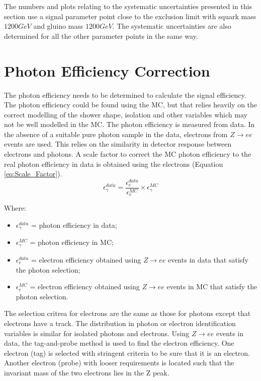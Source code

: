 The numbers and plots relating to the systematic uncertainties presented in this 
section use a signal parameter point close to the exclusion limit with squark 
mass $1200\unit{GeV}$ and gluino mass $1200\unit{GeV}$. The systematic 
uncertainties are also determined for all the other parameter points in the same 
way.

\section{Photon Efficiency Correction}
\label{sec:phoeff}

The photon efficiency needs to be determined to calculate the signal efficiency.
The photon efficiency could be found using the MC, but that relies heavily on
the correct modelling of the shower shape, isolation and other variables which
may not be well modelled in the MC. The photon efficiency is measured from data. 
In the absence of a suitable pure photon sample in the data, electrons from 
$Z\rightarrow ee$ events are used. This relies on the similarity in detector 
response between electrons and photons. A scale factor to correct the MC photon 
efficiency to the real photon efficiency in data is obtained using the electrons 
(Equation \ref{eq:Scale_Factor}). \\

\begin{equation}
\epsilon_{\gamma}^{data} = \frac{\epsilon_{e}^{data}}{\epsilon_{e}^{MC}}
\times \epsilon_{\gamma}^{MC}
\label{eq:Scale_Factor}
\end{equation}  

Where:
\begin{itemize}
\item $\epsilon_{\gamma}^{data}$ = photon efficiency in data;
\item $\epsilon_{\gamma}^{MC}$ = photon efficiency in MC;
\item $\epsilon_{e}^{data}$ = electron efficiency obtained using $Z\rightarrow
ee$ events in data that satisfy the photon selection; 
\item $\epsilon_{e}^{MC}$ = electron efficiency obtained using $Z\rightarrow ee$
events in MC that satisfy the photon selection. 
\end{itemize}

The selection critrea for electrons are the same as those for photons except 
that electrons have a track. The distribution in photon or electron 
identification variables is similar for isolated photons and electrons. Using 
$Z\rightarrow ee$ events in data, the tag-and-probe method is used to find the 
electron efficiency. One electron (tag) is selected with stringent criteria to 
be sure that it is an electron. Another electron (probe) with looser 
requirements is located such that the invariant mass of the two electrons lies 
in the Z peak. \\

